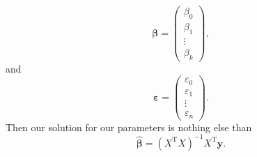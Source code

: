 \documentclass[10pt,a4paper, onecolumn, conference]{IEEEtran}
\theoremstyle{own}
\theoremstyle{definition}
\theoremstyle{plain}
\begin{document}
\begin{equation}
\boldsymbol\beta = \left( \begin{matrix} \beta_0 \\ \beta_1 \\ \vdots \\ \beta_k \end{matrix} \right),
\end{equation}
and
\begin{equation}
\boldsymbol\varepsilon = \left( \begin{matrix} \varepsilon_0 \\ \varepsilon_1 \\ \vdots \\ \varepsilon_n \end{matrix} \right).
\end{equation}
Then our solution for our parameters is nothing else than
\begin{equation}
\hat{\boldsymbol\beta} = (X^{\text{T}} X)^{-1} X^{\text{T}}\mathbf{y}.
\end{equation}
\end{document}
